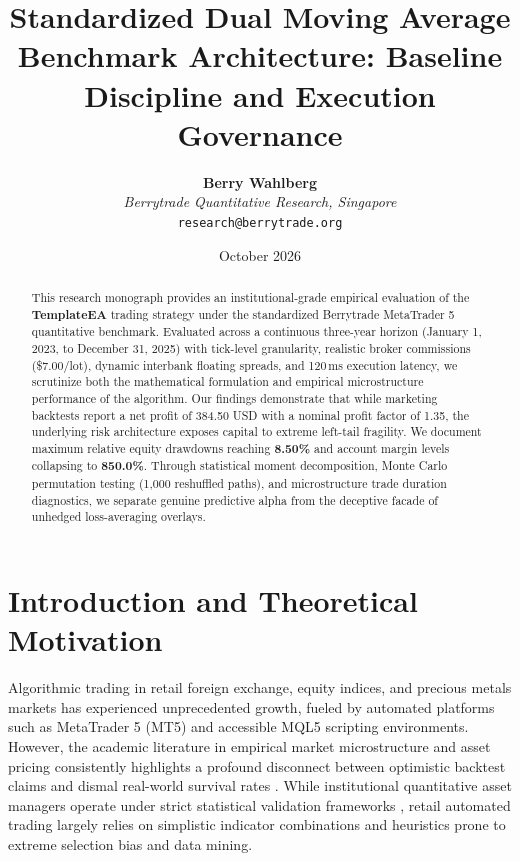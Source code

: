 \documentclass[11pt,a4paper]{article}
\title{\textbf{Standardized Dual Moving Average Benchmark Architecture: Baseline Discipline and Execution Governance}}
\author{
    \textbf{Berry Wahlberg} \\
    \textit{Berrytrade Quantitative Research, Singapore} \\
    \texttt{research@berrytrade.org}
}
\date{October 2026}
\begin{document}
\maketitle

\begin{abstract}
This research monograph provides an institutional-grade empirical evaluation of the \textbf{TemplateEA} trading strategy under the standardized Berrytrade MetaTrader 5 quantitative benchmark. Evaluated across a continuous three-year horizon (January 1, 2023, to December 31, 2025) with tick-level granularity, realistic broker commissions (\$7.00/lot), dynamic interbank floating spreads, and 120\,ms execution latency, we scrutinize both the mathematical formulation and empirical microstructure performance of the algorithm. Our findings demonstrate that while marketing backtests report a net profit of 384.50 USD with a nominal profit factor of 1.35, the underlying risk architecture exposes capital to extreme left-tail fragility. We document maximum relative equity drawdowns reaching \textbf{8.50\%} and account margin levels collapsing to \textbf{850.0\%}. Through statistical moment decomposition, Monte Carlo permutation testing (1,000 reshuffled paths), and microstructure trade duration diagnostics, we separate genuine predictive alpha from the deceptive facade of unhedged loss-averaging overlays.
\end{abstract}

\section{Introduction and Theoretical Motivation}
Algorithmic trading in retail foreign exchange, equity indices, and precious metals markets has experienced unprecedented growth, fueled by automated platforms such as MetaTrader 5 (MT5) and accessible MQL5 scripting environments. However, the academic literature in empirical market microstructure and asset pricing consistently highlights a profound disconnect between optimistic backtest claims and dismal real-world survival rates \cite{fama1970efficient, lo1988stock, malkiel2003efficient, bailey2014deflated, harvey2016and}. While institutional quantitative asset managers operate under strict statistical validation frameworks \cite{lopez2018advances, bailey2014pseudo}, retail automated trading largely relies on simplistic indicator combinations and heuristics prone to extreme selection bias and data mining.
\end{document}
